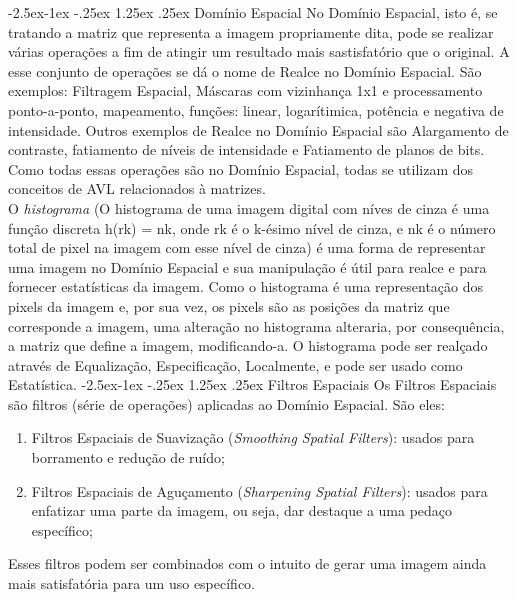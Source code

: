 \documentclass{article}
\makeatletter
\renewcommand\paragraph{\@startsection{paragraph}{4}{\z@}%
            {-2.5ex\@plus -1ex \@minus -.25ex}%
            {1.25ex \@plus .25ex}%
            {\normalfont\normalsize\bfseries}}
\makeatother
\begin{document}
                \paragraph{Domínio Espacial}
                    No Domínio Espacial, isto é, se tratando a matriz que representa a imagem propriamente dita, pode se realizar várias operações a fim de atingir um resultado mais sastisfatório que o original. A esse conjunto de operações se dá o nome de Realce no Domínio Espacial. São exemplos: Filtragem Espacial, Máscaras com vizinhança 1x1 e processamento ponto-a-ponto, mapeamento, funções: linear, logarítimica, potência e negativa de intensidade. Outros exemplos de Realce no Domínio Espacial são Alargamento de contraste, fatiamento de níveis de intensidade e Fatiamento de planos de bits. Como todas essas operações são no Domínio Espacial, todas se utilizam dos conceitos de AVL relacionados à matrizes.\\
                    O {\it histograma} (O histograma de uma imagem digital com níves de cinza é uma função discreta h(rk) = nk, onde rk é o k-ésimo nível de cinza, e nk é o número total de pixel na imagem com esse nível de cinza) é uma forma de representar uma imagem no Domínio Espacial e sua manipulação é útil para realce e para fornecer estatísticas da imagem. Como o histograma é uma representação dos pixels da imagem e, por sua vez, os pixels são as posições da matriz que corresponde a imagem, uma alteração no histograma alteraria, por consequência, a matriz que define a imagem, modificando-a. O histograma pode ser realçado através de Equalização, Especificação, Localmente, e pode ser usado como Estatística.
                \paragraph{Filtros Espaciais}
                Os Filtros Espaciais são filtros (série de operações) aplicadas ao Domínio Espacial. São eles:
                
                \begin{enumerate}
                
                \item Filtros Espaciais de Suavização ({\it Smoothing Spatial Filters}): usados para borramento e redução de ruído;
                
                \item Filtros Espaciais de Aguçamento ({\it Sharpening Spatial Filters}): usados para enfatizar uma parte da imagem, ou seja, dar destaque a uma pedaço específico;
                
                \end{enumerate}
                Esses filtros podem ser combinados com o intuito de gerar uma imagem ainda mais satisfatória para um uso específico.
                
\end{document}
